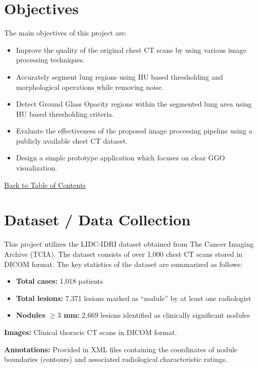 \documentclass[12pt,a4paper]{article}
\begin{document}
\newpage
\section{Objectives}
The main objectives of this project are:
\begin{itemize}
    \item Improve the quality of the original chest CT scans by using various image processing techniques.
    \item Accurately segment lung regions using HU based thresholding and morphological operations while removing noise.
    \item Detect Ground Glass Opacity regions within the segmented lung area using HU based thresholding criteria.
    \item Evaluate the effectiveness of the proposed image processing pipeline using a publicly available chest CT dataset.
    \item Design a simple prototype application which focuses on clear GGO visualization.
\end{itemize}

\hyperref[contents]{\small Back to Table of Contents}




\newpage
\section{Dataset / Data Collection}
This project utilizes the LIDC-IDRI dataset obtained from The Cancer Imaging Archive (TCIA). 
The dataset consists of over 1,000 chest CT scans stored in DICOM format. 
The key statistics of the dataset are summarized as follows:

\begin{itemize}
    \item \textbf{Total cases:} 1,018 patients
    \item \textbf{Total lesions:} 7,371 lesions marked as ``nodule'' by at least one radiologist
    \item \textbf{Nodules $\geq 3$ mm:} 2,669 lesions identified as clinically significant nodules
\end{itemize}

\noindent\textbf{Images:} Clinical thoracic CT scans in DICOM format.

\noindent\textbf{Annotations:} Provided in XML files containing the coordinates of nodule boundaries (contours) and associated radiological characteristic ratings.
\end{document}
